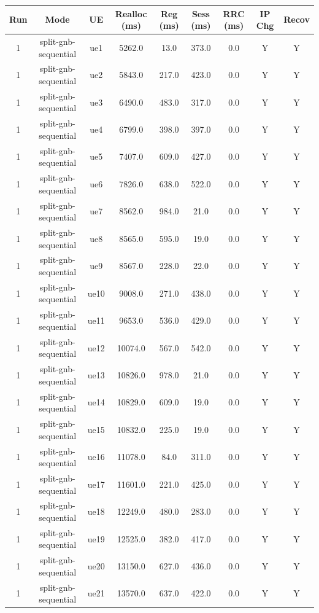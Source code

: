 \begin{table}[ht]
\centering
\begin{tabular}{|c|c|c|c|c|c|c|c|c|}
\hline
Run & Mode & UE & Realloc (ms) & Reg (ms) & Sess (ms) & RRC (ms) & IP Chg & Recov \\
\hline
1 & split-gnb-sequential & ue1 & 5262.0 & 13.0 & 373.0 & 0.0 & Y & Y \\
1 & split-gnb-sequential & ue2 & 5843.0 & 217.0 & 423.0 & 0.0 & Y & Y \\
1 & split-gnb-sequential & ue3 & 6490.0 & 483.0 & 317.0 & 0.0 & Y & Y \\
1 & split-gnb-sequential & ue4 & 6799.0 & 398.0 & 397.0 & 0.0 & Y & Y \\
1 & split-gnb-sequential & ue5 & 7407.0 & 609.0 & 427.0 & 0.0 & Y & Y \\
1 & split-gnb-sequential & ue6 & 7826.0 & 638.0 & 522.0 & 0.0 & Y & Y \\
1 & split-gnb-sequential & ue7 & 8562.0 & 984.0 & 21.0 & 0.0 & Y & Y \\
1 & split-gnb-sequential & ue8 & 8565.0 & 595.0 & 19.0 & 0.0 & Y & Y \\
1 & split-gnb-sequential & ue9 & 8567.0 & 228.0 & 22.0 & 0.0 & Y & Y \\
1 & split-gnb-sequential & ue10 & 9008.0 & 271.0 & 438.0 & 0.0 & Y & Y \\
1 & split-gnb-sequential & ue11 & 9653.0 & 536.0 & 429.0 & 0.0 & Y & Y \\
1 & split-gnb-sequential & ue12 & 10074.0 & 567.0 & 542.0 & 0.0 & Y & Y \\
1 & split-gnb-sequential & ue13 & 10826.0 & 978.0 & 21.0 & 0.0 & Y & Y \\
1 & split-gnb-sequential & ue14 & 10829.0 & 609.0 & 19.0 & 0.0 & Y & Y \\
1 & split-gnb-sequential & ue15 & 10832.0 & 225.0 & 19.0 & 0.0 & Y & Y \\
1 & split-gnb-sequential & ue16 & 11078.0 & 84.0 & 311.0 & 0.0 & Y & Y \\
1 & split-gnb-sequential & ue17 & 11601.0 & 221.0 & 425.0 & 0.0 & Y & Y \\
1 & split-gnb-sequential & ue18 & 12249.0 & 480.0 & 283.0 & 0.0 & Y & Y \\
1 & split-gnb-sequential & ue19 & 12525.0 & 382.0 & 417.0 & 0.0 & Y & Y \\
1 & split-gnb-sequential & ue20 & 13150.0 & 627.0 & 436.0 & 0.0 & Y & Y \\
1 & split-gnb-sequential & ue21 & 13570.0 & 637.0 & 422.0 & 0.0 & Y & Y \\

\end{tabular}
\end{table}
